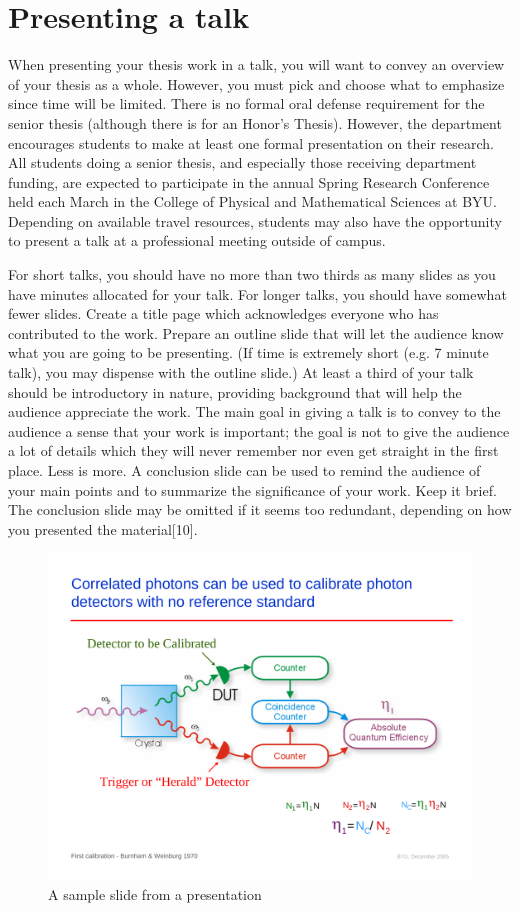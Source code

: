 \chapter{Presenting a talk}
\label{app:Talk}

When presenting your thesis work in a talk, you will want to convey
an overview of your thesis as a whole. However, you must pick and
choose what to emphasize since time will be limited. There is no
formal oral defense requirement for the senior thesis (although
there is for an Honor's Thesis). However, the department encourages
students to make at least one formal presentation on their research.
All students doing a senior thesis, and especially those receiving
department funding, are expected to participate in the annual Spring
Research Conference held each March in the College of Physical and
Mathematical Sciences at BYU. Depending on available travel
resources, students may also have the opportunity to present a talk
at a professional meeting outside of campus.

For short talks, you should have no more than two thirds as many
slides as you have minutes allocated for your talk. For longer
talks, you should have somewhat fewer slides. Create a title page
which acknowledges everyone who has contributed to the work. Prepare
an outline slide that will let the audience know what you are going
to be presenting. (If time is extremely short (e.g. 7 minute talk),
you may dispense with the outline slide.) At least a third of your
talk should be introductory in nature, providing background that
will help the audience appreciate the work. The main goal in giving
a talk is to convey to the audience a sense that your work is
important; the goal is not to give the audience a lot of details
which they will never remember nor even get straight in the first
place. Less is more. A conclusion slide can be used to remind the
audience of your main points and to summarize the significance of
your work. Keep it brief. The conclusion slide may be omitted if it
seems too redundant, depending on how you presented the
material[10].

\begin{figure}
    \centerline{\includegraphics[width=6.5in]{Slide}}
    \caption{\label{fig:Slide} A sample slide from a presentation}
\end{figure}

